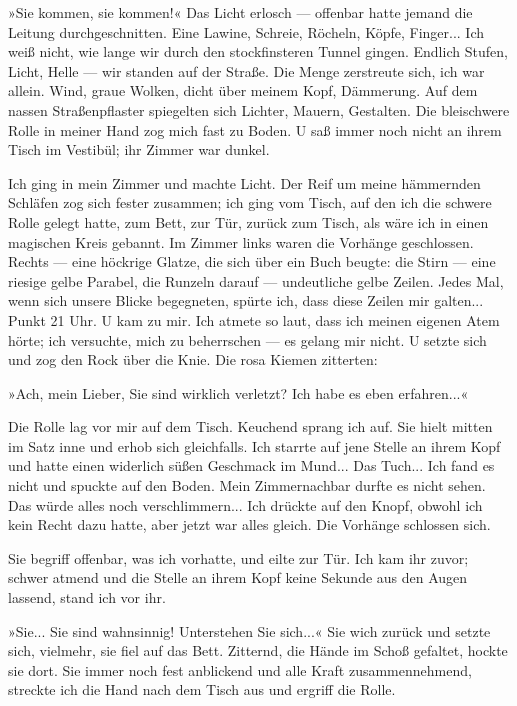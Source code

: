»Sie kommen, sie kommen!« Das Licht erlosch — offenbar hatte jemand
die Leitung durchgeschnitten. Eine Lawine, Schreie, Röcheln, Köpfe,
Finger... Ich weiß nicht, wie lange wir durch den stockfinsteren
Tunnel gingen. Endlich Stufen, Licht, Helle — wir standen auf der
Straße. Die Menge zerstreute sich, ich war allein. Wind, graue
Wolken, dicht über meinem Kopf, Dämmerung. Auf dem nassen
Straßenpflaster spiegelten sich Lichter, Mauern, Gestalten. Die
bleischwere Rolle in meiner Hand zog mich fast zu Boden. U saß
immer noch nicht an ihrem Tisch im Vestibül; ihr Zimmer war
dunkel.

Ich ging in mein Zimmer und machte Licht. Der Reif um meine
hämmernden Schläfen zog sich fester zusammen; ich ging vom Tisch,
auf den ich die schwere Rolle gelegt hatte, zum Bett, zur Tür,
zurück zum Tisch, als wäre ich in einen magischen Kreis gebannt. Im
Zimmer links waren die Vorhänge geschlossen. Rechts — eine höckrige
Glatze, die sich über ein Buch beugte: die Stirn — eine riesige
gelbe Parabel, die Runzeln darauf — undeutliche gelbe Zeilen. Jedes
Mal, wenn sich unsere Blicke begegneten, spürte ich, dass diese
Zeilen mir galten... Punkt 21 Uhr. U kam zu mir. Ich atmete so
laut, dass ich meinen eigenen Atem hörte; ich versuchte, mich zu
beherrschen — es gelang mir nicht. U setzte sich und zog den Rock
über die Knie. Die rosa Kiemen zitterten:

»Ach, mein Lieber, Sie sind wirklich verletzt? Ich habe es eben
erfahren...«

Die Rolle lag vor mir auf dem Tisch. Keuchend sprang ich auf. Sie
hielt mitten im Satz inne und erhob sich gleichfalls. Ich starrte
auf jene Stelle an ihrem Kopf und hatte einen widerlich süßen
Geschmack im Mund... Das Tuch... Ich fand es nicht und spuckte auf
den Boden. Mein Zimmernachbar durfte es nicht sehen. Das würde
alles noch verschlimmern... Ich drückte auf den Knopf, obwohl ich
kein Recht dazu hatte, aber jetzt war alles gleich. Die Vorhänge
schlossen sich.

Sie begriff offenbar, was ich vorhatte, und eilte zur Tür. Ich kam
ihr zuvor; schwer atmend und die Stelle an ihrem Kopf keine Sekunde
aus den Augen lassend, stand ich vor ihr.

»Sie... Sie sind wahnsinnig! Unterstehen Sie sich...« Sie wich
zurück und setzte sich, vielmehr, sie fiel auf das Bett. Zitternd,
die Hände im Schoß gefaltet, hockte sie dort. Sie immer noch fest
anblickend und alle Kraft zusammennehmend, streckte ich die Hand
nach dem Tisch aus und ergriff die Rolle.

